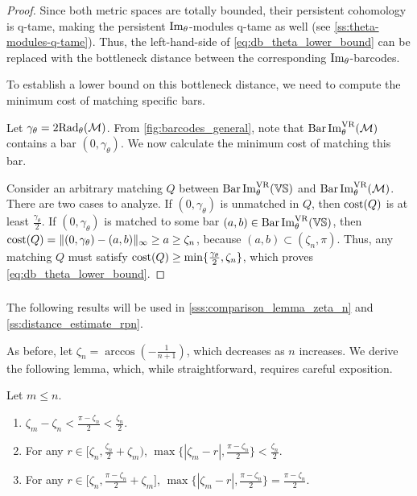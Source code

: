 \begin{proof}
    Since both metric spaces are totally bounded, their persistent cohomology is q-tame, making the persistent $\operatorname{Im}_\theta$-modules q-tame as well (see \cref{ss:theta-modules-q-tame}).
    Thus, the left-hand-side of \cref{eq:db_theta_lower_bound} can be replaced with the bottleneck distance between the corresponding $\operatorname{Im}_\theta$-barcodes.

    To establish a lower bound on this bottleneck distance, we need to compute the minimum cost of matching specific bars.

    Let \( \gamma_\theta = 2\mathrm{Rad}_{\theta}(\mathcal{M}) \).
    From \cref{fig:barcodes_general}, note that \( \operatorname{Bar}\operatorname{Im}_{\theta}^{\mathrm{VR}} (\mathcal{M}) \) contains a bar \( (0, \gamma_\theta) \).
    We now calculate the minimum cost of matching this bar.

    Consider an arbitrary matching \( Q \) between \( \operatorname{Bar}\operatorname{Im}_{\theta}^{\mathrm{VR}} (\mathbb{VS}) \) and \( \operatorname{Bar}\operatorname{Im}_{\theta}^{\mathrm{VR}} (\mathcal{M}) \).
    There are two cases to analyze.
	If $(0,\gamma_\theta )$ is unmatched in $Q$, then $\mathrm{cost}(Q)$ is at least $ \tfrac{\gamma_\theta }{2}$.
	If $(0,\gamma_\theta )$ is matched to some bar $(a,b) \in \operatorname{Bar}\operatorname{Im}_{\theta}^{\mathrm{VR}} (\mathbb{VS})$, then
	$\mathrm{cost}(Q) =  \|(0,\gamma_\theta ) - (a,b)\|_\infty \geq a \geq \zeta_n$, because $(a,b) \subset (\zeta_n, \pi)$.
	Thus, any matching $Q$ must satisfy $\mathrm{cost}(Q) \geq \min\{\tfrac{\gamma_\theta }{2}, \zeta_n\}$, which proves \cref{eq:db_theta_lower_bound}.
\end{proof}


\subsubsection{}
\label{sss:comparison_lemma}

The following results will be used in \cref{sss:comparison_lemma_zeta_n} and \cref{ss:distance_estimate_rpn}.

As before, let $\zeta_n = \arccos{(-\tfrac{1}{n+1})}$, which decreases as $n$ increases.
We derive the following lemma, which, while straightforward, requires careful exposition.

\medskip\lemma
Let $m \leq n$.
\begin{enumerate}
    \item \(\zeta_m - \zeta_n < \tfrac{\pi - \zeta_n}{2} < \tfrac{\zeta_n}{2}.\)

    \item For any $r \in \big[\zeta_n, \tfrac{\zeta_n}{2}+\zeta_m\big)$, $\max\big\{|\zeta_m  - r |, \tfrac{\pi - \zeta_n}{2}\big\} < \tfrac{\zeta_n}{2}$.

    \item For any $r \in \big[\zeta_n, \tfrac{\pi - \zeta_n}{2} + \zeta_m\big]$, $\max\{|\zeta_m  - r |, \tfrac{\pi - \zeta_n}{2}\} = \tfrac{\pi - \zeta_n}{2}$.
\end{enumerate}


